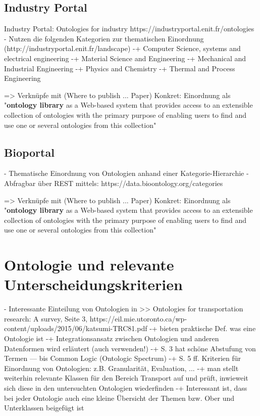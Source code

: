 \documentclass{article}
\begin{document}
\subsection{Industry Portal}

Industry Portal: Ontologies for industry https://industryportal.enit.fr/ontologies
- Nutzen die folgenden Kategorien zur thematischen Einordnung (http://industryportal.enit.fr/landscape)
-+ Computer Science, systems and electrical engineering
-+ Material Science and Engineering
-+ Mechanical and Industrial Engineering
-+ Physics and Chemistry
-+ Thermal and Process Engineering

=> Verknüpfe mit (Where to publish ... Paper) \cite{d2012publish}
Konkret: Einordnung als "\textbf{ontology library} as a Web-based system that provides access to an
extensible collection of ontologies with the primary purpose of enabling users to find and
use one or several ontologies from this collection"



\subsection{Bioportal}

- Thematische Einordnung von Ontologien anhand einer Kategorie-Hierarchie
  - Abfragbar über REST mittels: https://data.bioontology.org/categories

=> Verknüpfe mit (Where to publish ... Paper) \cite{d2012publish}
Konkret: Einordnung als "\textbf{ontology library} as a Web-based system that provides access to an
extensible collection of ontologies with the primary purpose of enabling users to find and
use one or several ontologies from this collection"




\section{Ontologie und relevante Unterscheidungskriterien}

- Interessante Einteilung von Ontologien in >> Ontologies for transportation research: A survey, Seite 3, https://eil.mie.utoronto.ca/wp-content/uploads/2015/06/katsumi-TRC81.pdf
-+ bieten praktische Def. was eine Ontologie ist
-+ Integrationsansatz zwischen Ontologien und anderen Datenformen wird erläutert (auch verwenden!)
-+ S. 3 hat schöne Abstufung von Termen --- bis Common Logic (Ontologic Spectrum)
-+ S. 5 ff. Kriterien für Einordnung von Ontologien: z.B. Granularität, Evaluation, ...
-+ man stellt weiterhin relevante Klassen für den Bereich Transport auf und prüft, inwieweit sich diese in den untersuchten Ontologien wiederfinden
-+ Interessant ist, dass bei jeder Ontologie auch eine kleine Übersicht der Themen bzw. Ober und Unterklassen beigefügt ist
\end{document}
